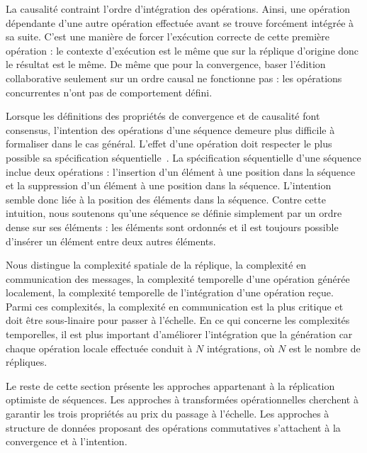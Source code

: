 \noindent La causalité contraint l'ordre d'intégration des opérations. Ainsi,
une opération dépendante d'une autre opération effectuée avant se trouve
forcément intégrée à sa suite. C'est une manière de forcer l'exécution correcte
de cette première opération : le contexte d'exécution est le même que sur la
réplique d'origine donc le résultat est le même.  
De même que pour la convergence, baser l'édition collaborative seulement sur un
ordre causal ne fonctionne pas : les opérations concurrentes n'ont pas de
comportement défini.

\noindent Lorsque les définitions des propriétés de convergence et de causalité
font consensus, l'intention des opérations d'une séquence demeure plus difficile
à formaliser dans le cas général. L'effet d'une opération doit respecter le plus
possible sa spécification séquentielle~\cite{bieniusa2012brief}. La
spécification séquentielle d'une séquence inclue deux opérations : l'insertion
d'un élément à une position dans la séquence et la suppression d'un élément à
une position dans la séquence. L'intention semble donc liée à la position des
éléments dans la séquence. Contre cette intuition, nous soutenons qu'une
séquence se définie simplement par un ordre dense sur ses éléments : les
éléments sont ordonnés et il est toujours possible d'insérer un élément entre
deux autres éléments.

Nous distingue la complexité spatiale de la réplique, la complexité en
communication des messages, la complexité temporelle d'une opération générée
localement, la complexité temporelle de l'intégration d'une opération
reçue. Parmi ces complexités, la complexité en communication est la plus
critique et doit être sous-linaire pour passer à l'échelle. En ce qui concerne
les complexités temporelles, il est plus important d'améliorer l'intégration que
la génération car chaque opération locale effectuée conduit à $N$ intégrations,
où $N$ est le nombre de répliques.

Le reste de cette section présente les approches appartenant à la réplication
optimiste de séquences. Les approches à transformées opérationnelles cherchent à
garantir les trois propriétés au prix du passage à l'échelle. Les approches à
structure de données proposant des opérations commutatives s'attachent à la
convergence et à l'intention.


